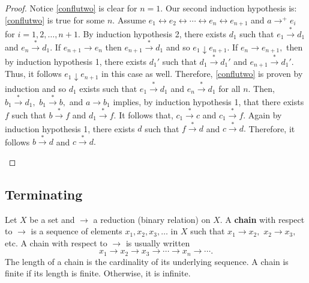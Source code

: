 \documentclass[
  letterpaper,
  10pt,
  reqno,
  twopage,
  openany]{book}
\theoremstyle{plain}
\theoremstyle{definition}
\theoremstyle{definition}
\theoremstyle{definition}
\theoremstyle{plain}
\theoremstyle{plain}
\theoremstyle{remark}
\begin{document}
\begin{proof}
Notice \eqref{conflutwo} is clear for \(n=1.\) Our second induction
hypothesis is: \eqref{conflutwo} is true for some \(n.\) Assume
\(e_1\longleftrightarrow e_2 \longleftrightarrow \cdots \longleftrightarrow e_n \longleftrightarrow e_{n+1}\)
and \(a\longrightarrow^+ e_i\) for \(i=1, 2, \ldots,n+1.\) By induction
hypothesis 2, there exists \(d_1\) such that
\(e_1\stackrel{*}{\longrightarrow} d_1\) and
\(e_n\stackrel{*}{\longrightarrow} d_1.\) If
\(e_{n+1}\longrightarrow e_n\) then
\(e_{n+1} \stackrel{*}{\longrightarrow} d_1\) and so
\(e_1\downarrow e_{n+1}.\) If \(e_n \longrightarrow e_{n+1},\) then by
induction hypothesis 1, there exists \(d_1'\) such that
\(d_1\stackrel{*}{\longrightarrow} d_1'\) and
\(e_{n+1} \stackrel{*}{\longrightarrow} d_1'.\) Thus, it follows
\(e_1\downarrow e_{n+1}\) in this case as well. Therefore,
\eqref{conflutwo} is proven by induction and so \(d_1\) exists such that
\(e_1\stackrel{*}{\longrightarrow} d_1\) and
\(e_n\stackrel{*}{\longrightarrow} d_1\) for all \(n.\) Then,
\(b_1 \stackrel{*}{\longrightarrow} d_1,\)
\(b_1 \stackrel{*}{\longrightarrow} b,\) and \(a\longrightarrow b_1\)
implies, by induction hypothesis 1, that there exists \(f\) such that
\(b \stackrel{*}{\longrightarrow} f\) and
\(d_1 \stackrel{*}{\longrightarrow} f.\) It follows that,
\(c_1 \stackrel{*}{\longrightarrow} c\) and
\(c_1 \stackrel{*}{\longrightarrow} f.\) Again by induction hypothesis
1, there exists \(d\) such that \(f \stackrel{*}{\longrightarrow} d\)
and \(c \stackrel{*}{\longrightarrow} d.\) Therefore, it follows
\(b \stackrel{*}{\longrightarrow} d\) and
\(c \stackrel{*}{\longrightarrow} d.\)

\begin{figure}[htbp]
\centering
\end{figure}

\end{proof}

\hypertarget{terminating}{%
\subsection{Terminating}\label{terminating}}

Let \(X\) be a set and \(\to\) a reduction (binary relation) on \(X.\) A
 \textbf{chain} with respect to \(\to\) is a sequence of
elements \(x_1,x_2,x_3,\ldots\) in \(X\) such that \(x_1\to x_2,\)
\(x_2\to x_3,\) etc. A chain with respect to \(\to\) is usually written
\[x_1\to x_2 \to x_3 \to \cdots \to x_n \to \cdots.\] The length of a
chain is the cardinality of its underlying sequence. A chain is finite
if its length is finite. Otherwise, it is infinite.
\end{document}
